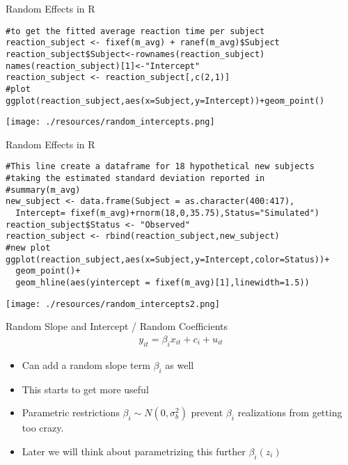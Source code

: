 \documentclass[aspectratio=169]{beamer}
\begin{document}
\begin{frame}[fragile]{Random Effects in R}
\begin{verbatim}
#to get the fitted average reaction time per subject
reaction_subject <- fixef(m_avg) + ranef(m_avg)$Subject
reaction_subject$Subject<-rownames(reaction_subject)
names(reaction_subject)[1]<-"Intercept"
reaction_subject <- reaction_subject[,c(2,1)]
#plot
ggplot(reaction_subject,aes(x=Subject,y=Intercept))+geom_point()
\end{verbatim}
\end{frame}


\begin{frame}%
\begin{center}
\texttt{[image: ./resources/random\_intercepts.png]}
\end{center}
\end{frame}

\begin{frame}[fragile]{Random Effects in R}
\footnotesize
\begin{verbatim}
#This line create a dataframe for 18 hypothetical new subjects
#taking the estimated standard deviation reported in
#summary(m_avg)
new_subject <- data.frame(Subject = as.character(400:417),
  Intercept= fixef(m_avg)+rnorm(18,0,35.75),Status="Simulated")
reaction_subject$Status <- "Observed"
reaction_subject <- rbind(reaction_subject,new_subject)
#new plot
ggplot(reaction_subject,aes(x=Subject,y=Intercept,color=Status))+
  geom_point()+
  geom_hline(aes(yintercept = fixef(m_avg)[1],linewidth=1.5))

\end{verbatim}
\end{frame}

\begin{frame}%
\begin{center}
\texttt{[image: ./resources/random\_intercepts2.png]}
\end{center}
\end{frame}

\begin{frame}{Random Slope and Intercept / Random Coefficients}
\begin{align*}
y_{it} = \beta_i x_{it} + c_i + u_{it}
\end{align*}
\begin{itemize}
\item Can add a random slope term $\beta_i$ as well
\item This starts to get more useful
\item Parametric restrictions $\beta_i \sim N(0,\sigma_b^2)$ prevent $\beta_i$ realizations from getting too crazy.
\item Later we will think about parametrizing this further $\beta_i(z_i)$
\end{itemize}
\end{frame}
\end{document}
